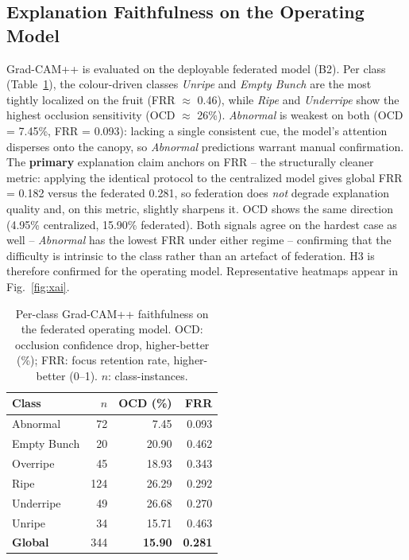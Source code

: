 \documentclass[twocolumn,a4paper,10pt]{article}
\begin{document}
\subsection{Explanation Faithfulness on the Operating Model}
Grad-CAM++ is evaluated on the deployable federated model (B2). Per class
(Table~\ref{tab:xai}), the colour-driven classes \emph{Unripe} and \emph{Empty
Bunch} are the most tightly localized on the fruit (FRR $\approx$ 0.46), while
\emph{Ripe} and \emph{Underripe} show the highest occlusion sensitivity (OCD
$\approx$ 26\%). \emph{Abnormal} is weakest on both (OCD = 7.45\%, FRR =
0.093): lacking a single consistent cue, the model's attention disperses onto
the canopy, so \emph{Abnormal} predictions warrant manual confirmation. The
\textbf{primary} explanation claim anchors on FRR -- the structurally cleaner
metric: applying the identical protocol to the centralized model gives global
FRR = 0.182 versus the federated 0.281, so federation does \emph{not} degrade
explanation quality and, on this metric, slightly sharpens it. OCD shows the
same direction (4.95\% centralized, 15.90\% federated). Both signals agree on
the hardest case as well -- \emph{Abnormal} has the lowest FRR under either
regime -- confirming that the difficulty is intrinsic to the class rather than
an artefact of federation. H3 is therefore confirmed for the operating model.
Representative heatmaps appear in Fig.~\ref{fig:xai}.

\begin{table}[ht]
\centering
\caption{Per-class Grad-CAM++ faithfulness on the federated operating model.
OCD: occlusion confidence drop, higher-better (\%); FRR: focus retention rate,
higher-better (0--1). $n$: class-instances.}
\label{tab:xai}
\small
\begin{tabular}{lrrr}
\toprule
\textbf{Class} & \textbf{$n$} & \textbf{OCD (\%)} & \textbf{FRR} \\
\midrule
Abnormal        & 72  & 7.45  & 0.093 \\
Empty Bunch     & 20  & 20.90 & 0.462 \\
Overripe        & 45  & 18.93 & 0.343 \\
Ripe            & 124 & 26.29 & 0.292 \\
Underripe       & 49  & 26.68 & 0.270 \\
Unripe          & 34  & 15.71 & 0.463 \\
\midrule
\textbf{Global} & 344 & \textbf{15.90} & \textbf{0.281} \\
\bottomrule
\end{tabular}
\end{table}
\end{document}

